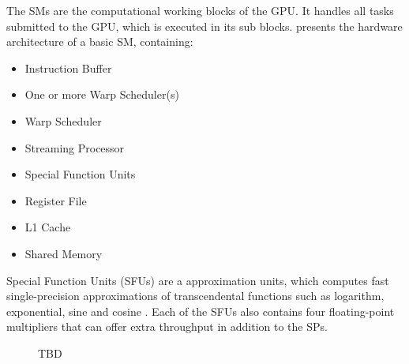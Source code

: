 The SMs are the computational working blocks of the GPU.
It handles all tasks submitted to the GPU, which is executed in its sub blocks.
 presents the hardware architecture of a basic SM, containing:

\begin{itemize}
	\item Instruction Buffer
	\item One or more Warp Scheduler(s)
	\item Warp Scheduler
	\item Streaming Processor
	\item Special Function Units
	\item Register File
	\item L1 Cache
	\item Shared Memory
\end{itemize}

Special Function Units (SFUs) are a approximation units, which computes fast single-precision approximations of transcendental functions such as logarithm, exponential, sine and cosine \cite{Wilt2013}.
Each of the SFUs also contains four floating-point multipliers that can offer extra throughput in addition to the SPs\cite{Li2016}.

\begin{figure}[H]
	\centering
	\caption{TBD}
	\label{fig:hw-sm}
\end{figure}